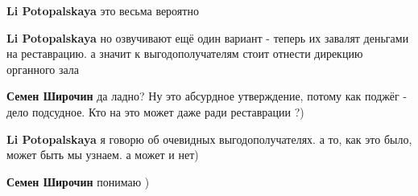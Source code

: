 \begin{itemize}
\begin{itemize}
 
\textbf{Li Potopalskaya} это весьма вероятно

 
\textbf{Li Potopalskaya} но озвучивают ещё один вариант - теперь их завалят деньгами на реставрацию. а значит к выгодополучателям стоит отнести дирекцию органного зала

 
\textbf{Семен Широчин} да ладно? Ну это абсурдное утверждение, потому как поджёг - дело подсудное. Кто на это может даже ради реставрации ?)

 
\textbf{Li Potopalskaya} я говорю об очевидных выгодополучателях. а то, как это было, может быть мы узнаем. а может и нет)

 
\textbf{Семен Широчин} понимаю )

\end{itemize}

 


\end{itemize}
